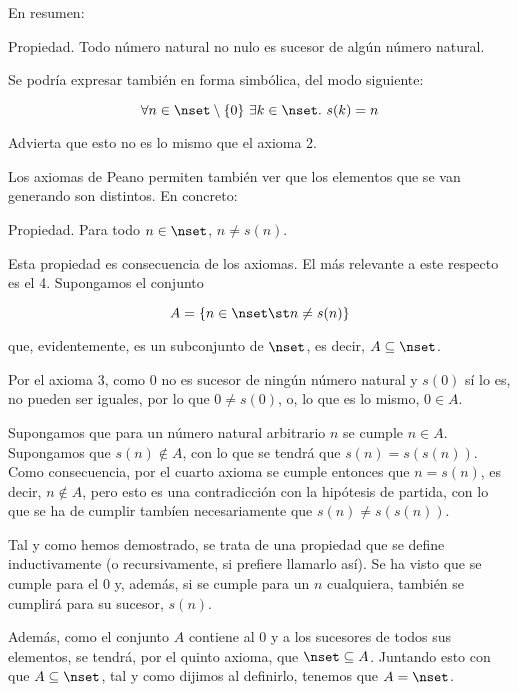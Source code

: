 En resumen:


Propiedad. Todo número natural no nulo es sucesor de algún número natural.

Se podría expresar también en forma simbólica, del modo siguiente:

$$ \forall n \in \nset \setminus \{0\} \ \exists k \in \nset. \ s(k) = n $$

\noindent Advierta que esto no es lo mismo que el axioma 2.

Los axiomas de Peano permiten también ver que los elementos que se van
generando son distintos. En concreto:

Propiedad. Para todo $n \in \nset$, $n \neq s(n)$.


Esta propiedad es consecuencia de los axiomas. El más relevante a este
respecto es el 4. Supongamos el conjunto

$$ A = \{ n \in \nset \st n \neq s(n) \} $$

\noindent que, evidentemente, es un subconjunto de $\nset$, es decir, $A
\subseteq \nset$.

Por el axioma 3, como 0 no es sucesor de ningún número natural y $s(0)$ sí
lo es, no pueden ser iguales, por lo que $0 \neq s(0)$, o, lo que es lo
mismo, $0 \in A$.

Supongamos que para un número natural arbitrario $n$ se cumple $n \in A$.
Supongamos que $s(n) \notin A$, con lo que se tendrá que $s(n) = s(s(n))$.
Como consecuencia, por el cuarto axioma se cumple entonces que $n = s(n)$,
es decir, $n \notin A$, pero esto es una contradicción con la hipótesis de
partida, con lo que se ha de cumplir tambíen necesariamente que $s(n) \neq
s(s(n))$.

Tal y como hemos demostrado, se trata de una propiedad que se define
inductivamente (o recursivamente, si prefiere llamarlo así). Se ha visto que
se cumple para el 0 y, además, si se cumple para un $n$ cualquiera, también
se cumplirá para su sucesor, $s(n)$.

Además, como el conjunto $A$ contiene al 0 y a los sucesores de todos sus
elementos, se tendrá, por el quinto axioma, que $\nset \subseteq A$.
Juntando esto con que $A \subseteq \nset$, tal y como dijimos al definirlo,
tenemos que $A = \nset$.

